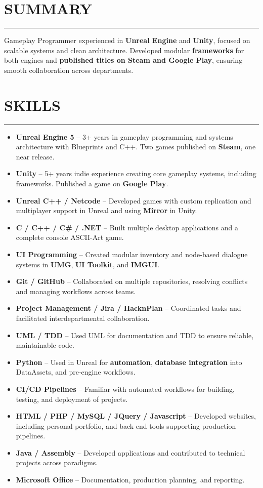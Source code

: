 \documentclass[7pt]{article}
\newcommand{\sectionline}{\vspace{-0.3em}\noindent\rule{\linewidth}{0.15pt}\vspace{0.08em}}
\newcommand{\cvsection}[2]{%
    \section*{{\large\textbf{\MakeUppercase{#1}}}}
    \vspace{-0.5em}
    \sectionline
    \vspace{-0.15em}
    #2
}
\begin{document}
    \cvsection{SUMMARY}{
        Gameplay Programmer experienced in \textbf{Unreal Engine} and \textbf{Unity}, focused on scalable systems and clean architecture.
        Developed modular \textbf{frameworks} for both engines and \textbf{published titles on Steam and Google Play}, ensuring smooth collaboration across departments.
    }
    \cvsection{SKILLS}{
        \begin{itemize}[noitemsep, topsep=0pt, parsep=0pt, partopsep=0pt, itemsep=0pt, leftmargin=*]
            \item \textbf{Unreal Engine 5} – 3+ years in gameplay programming and systems architecture with Blueprints and C++. Two games published on \textbf{Steam}, one near release.
            \item \textbf{Unity} – 5+ years indie experience creating core gameplay systems, including frameworks. Published a game on \textbf{Google Play}.
            \item \textbf{Unreal C++ / Netcode} – Developed games with custom replication and multiplayer support in Unreal and using \textbf{Mirror} in Unity.
            \item \textbf{C / C++ / C\# / .NET} – Built multiple desktop applications and a complete console ASCII-Art game.
            \item \textbf{UI Programming} – Created modular inventory and node-based dialogue systems in \textbf{UMG}, \textbf{UI Toolkit}, and \textbf{IMGUI}.
            \item \textbf{Git / GitHub} – Collaborated on multiple repositories, resolving conflicts and managing workflows across teams.
            \item \textbf{Project Management / Jira / HacknPlan} – Coordinated tasks and facilitated interdepartmental collaboration.
            \item \textbf{UML / TDD} – Used UML for documentation and TDD to ensure reliable, maintainable code.
            \item \textbf{Python} – Used in Unreal for \textbf{automation}, \textbf{database integration} into DataAssets, and pre-engine workflows.
            \item \textbf{CI/CD Pipelines} – Familiar with automated workflows for building, testing, and deployment of projects.
            \item \textbf{HTML / PHP / MySQL / JQuery / Javascript} – Developed websites, including personal portfolio, and back-end tools supporting production pipelines.
            \item \textbf{Java / Assembly} – Developed applications and contributed to technical projects across paradigms.
            \item \textbf{Microsoft Office} – Documentation, production planning, and reporting.
        \end{itemize}
    }
\end{document}
